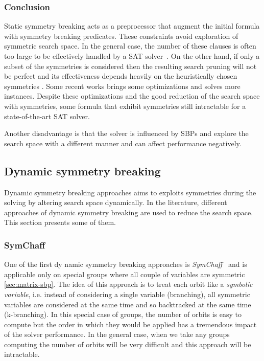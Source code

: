 \subsubsection{Conclusion}
Static symmetry breaking acts as a preprocessor that augment the initial formula with
symmetry breaking predicates. These constraints avoid exploration of symmetric search space.
In the general case, the number of these clauses is often too large to be
effectively handled by a SAT solver~\cite{Luks2004}. 
On the other hand, if only a subset of the symmetries is considered then the resulting search pruning
will not be perfect and its effectiveness depends heavily on the
heuristically chosen symmetries \cite{biere2009handbook}.
Some recent works brings some optimizations and solves more instances.
Despite these optimizations and the good reduction of the search space with symmetries,
 some formula that exhibit symmetries still intractable for a state-of-the-art SAT solver.
 

Another disadvantage is that the solver is influenced by SBPs and explore the search space with a different 
manner and can affect performance negatively.

% 


\subsection{Dynamic symmetry breaking}


Dynamic symmetry breaking approaches aims to exploits symmetries during the solving by altering search space dynamically.
In the literature, different approaches of dynamic symmetry breaking are used to reduce the search space.
This section presents some of them.

%
%


\subsubsection{SymChaff}
One of the first dy namic symmetry breaking approaches is \emph{SymChaff}~\cite{sabharwal2005symchaff}
and is applicable only on special groups where all couple of variables are symmetric \cref{sec:matrix-sbp}.
The idea of this approach is to treat each orbit like a \emph{symbolic variable}, i.e. instead of considering a single
variable (branching), all symmetric variables are considered at the same time and so backtracked at the same time 
(k-branching).
In this special case of groups, the number of orbits is easy to compute but the order in which they would be
applied has a tremendous impact of the solver performance.
In the general case, when we take any groups computing the number of orbits will be very difficult and this approach
will be intractable.

